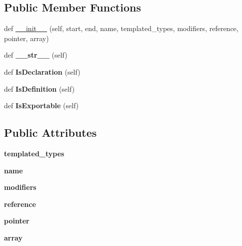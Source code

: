 \subsection*{Public Member Functions}
\begin{DoxyCompactItemize}
\item 
def \mbox{\hyperlink{classcpp_1_1ast_1_1_type_adc20d88db721b5d7b513c08a4d6753c9}{\+\_\+\+\_\+init\+\_\+\+\_\+}} (self, start, end, name, templated\+\_\+types, modifiers, reference, pointer, array)
\item 
\mbox{\label{classcpp_1_1ast_1_1_type_a1a10eff21f6150b7e14bde3788fa069b}} 
def {\bfseries \+\_\+\+\_\+str\+\_\+\+\_\+} (self)
\item 
\mbox{\label{classcpp_1_1ast_1_1_type_a590071a2bce7ea5140d7eb86c90f63bf}} 
def {\bfseries Is\+Declaration} (self)
\item 
\mbox{\label{classcpp_1_1ast_1_1_type_aedff25dc3736e83388742e55fe29159b}} 
def {\bfseries Is\+Definition} (self)
\item 
\mbox{\label{classcpp_1_1ast_1_1_type_a80dce781581c03e550ce51a9a33ca158}} 
def {\bfseries Is\+Exportable} (self)
\end{DoxyCompactItemize}
\subsection*{Public Attributes}
\begin{DoxyCompactItemize}
\item 
\mbox{\label{classcpp_1_1ast_1_1_type_a7c38fcafa00dae6ee22bab783086a1a7}} 
{\bfseries templated\+\_\+types}
\item 
\mbox{\label{classcpp_1_1ast_1_1_type_a5905424e2b65f0215b6ecd73b4bfe24c}} 
{\bfseries name}
\item 
\mbox{\label{classcpp_1_1ast_1_1_type_a0effa0a077eda79943e881955b4c51a5}} 
{\bfseries modifiers}
\item 
\mbox{\label{classcpp_1_1ast_1_1_type_a8d2cddd631397c3bf86198cc420d584d}} 
{\bfseries reference}
\item 
\mbox{\label{classcpp_1_1ast_1_1_type_a37234bb68915c93894cbc8e366c1eaad}} 
{\bfseries pointer}
\item 
\mbox{\label{classcpp_1_1ast_1_1_type_a1fd0493e82da315bcb4c02b0cf2133a3}} 
{\bfseries array}
\end{DoxyCompactItemize}


